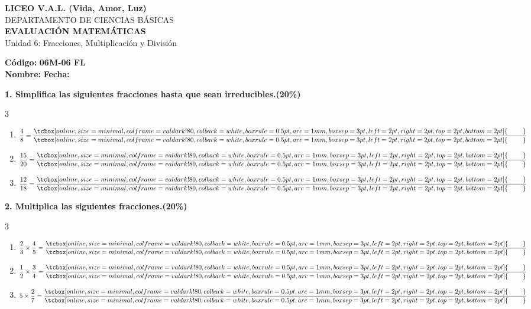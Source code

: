 \documentclass[12pt, letterpaper]{article}
\newcommand{\boxfill}[1][1.5cm]{\tcbox[on line, size=minimal, colframe=valdark!80, colback=white, boxrule=0.5pt, arc=1mm, boxsep=3pt, left=2pt, right=2pt, top=2pt, bottom=2pt]{\hspace*{#1}\vphantom{M}}}
\begin{document}
	
	\begin{center}
		{\Large \textbf{LICEO V.A.L. (Vida, Amor, Luz)}}\\[0.1cm]
		{\large DEPARTAMENTO DE CIENCIAS BÁSICAS}\\[0.1cm]
		\textbf{EVALUACIÓN MATEMÁTICAS}\\[0.1cm]
		Unidad 6: Fracciones, Multiplicación y División
	\end{center}
	
	\vspace{0.3cm}
	
	\hfill \textbf{Código:} \textbf{06M-06 FL}\\
	
	\noindent \textbf{Nombre:} \underline{\hspace{8cm}} \hspace{1cm}\textbf{Fecha:} \underline{\hspace{3cm}}
	
	\vspace{0.8cm}
	
	\noindent \textbf{1. Simplifica las siguientes fracciones hasta que sean irreducibles.\hfill (20\%)}
	
	\vspace{0.4cm}
	\begin{multicols}{3}
		\begin{enumerate}[label=\textbf{\Alph*)}, itemsep=0.8cm]
			\item $\dfrac{4}{8} = \dfrac{\boxfill[0.8cm]}{\boxfill[0.8cm]}$
			
			\item $\dfrac{15}{20} = \dfrac{\boxfill[0.8cm]}{\boxfill[0.8cm]}$
			
			\item $\dfrac{12}{18} = \dfrac{\boxfill[0.8cm]}{\boxfill[0.8cm]}$
		\end{enumerate}
	\end{multicols}
	
	\vspace{0.8cm}
	
	\noindent \textbf{2. Multiplica las siguientes fracciones.\hfill (20\%)}
	
	\vspace{0.5cm}
	\begin{multicols}{3}
		\begin{enumerate}[label=\textbf{\Alph*)}, itemsep=1.5cm]
			\item $\dfrac{2}{3} \times \dfrac{4}{5} = \dfrac{\boxfill[0.8cm]}{\boxfill[0.8cm]}$
			
			\item $\dfrac{1}{2} \times \dfrac{3}{4} = \dfrac{\boxfill[0.8cm]}{\boxfill[0.8cm]}$
			
			\item $5 \times \dfrac{2}{7} = \dfrac{\boxfill[0.8cm]}{\boxfill[0.8cm]}$
		\end{enumerate}
	\end{multicols}
	
\end{document}

